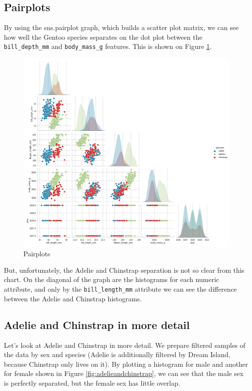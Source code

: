 \documentclass[12pt,a4paper]{article}
\begin{document}
\subsection{Pairplots}

By using the sns.pairplot graph, which builds a scatter plot matrix, we can see how well the Gentoo species separates on the dot plot between the \texttt{bill\_depth\_mm} and \texttt{body\_mass\_g} features. This is shown on Figure \ref{fig:pairplots}.

\begin{figure}[h]
	\centering
	\includegraphics[width=1.0\linewidth]{fig_pairplot}
	\caption{Pairplots}
	\label{fig:pairplots}
\end{figure}

But, unfortunately, the Adelie and Chinstrap separation is not so clear from this chart. On the diagonal of the graph are the histograms for each numeric attribute, and only by the \texttt{bill\_length\_mm} attribute we can see the difference between the Adelie and Chinstrap histograms.

\subsection{Adelie and Chinstrap in more detail}

Let's look at Adelie and Chinstrap in more detail. 
We prepare filtered samples of the data by sex and species (Adelie is additionally filtered by Dream Island, because Chinstrap only lives on it). 
By plotting a histogram for male and another for female shown in Figure \ref{fig:adelieandchinstrap}, we can see that the male sex is perfectly separated, but the female sex has little overlap.
\end{document}
